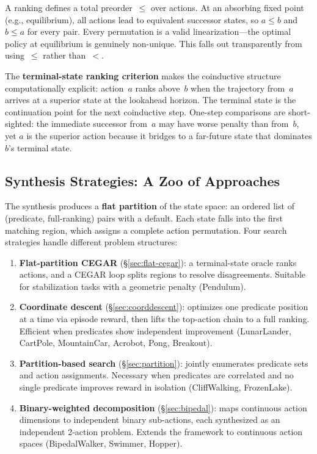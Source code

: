 \documentclass[9pt,a4paper]{article}
\theoremstyle{plain}
\theoremstyle{definition}
\theoremstyle{remark}
\begin{document}
A ranking defines a total preorder~$\le$ over actions.  At an
absorbing fixed point (e.g., equilibrium), all actions lead to
equivalent successor states, so $a \le b$ and $b \le a$ for every
pair.  Every permutation is a valid linearization---the optimal
policy at equilibrium is genuinely non-unique.  This falls out
transparently from using~$\le$ rather than~$<$.

The \textbf{terminal-state ranking criterion} makes the coinductive
structure computationally explicit: action~$a$ ranks above~$b$
when the trajectory from~$a$ arrives at a superior state at the
lookahead horizon.  The terminal state is the continuation point
for the next coinductive step.  One-step comparisons are
short-sighted: the immediate successor from~$a$ may have worse
penalty than from~$b$, yet $a$ is the superior action because it
bridges to a far-future state that dominates $b$'s terminal state.

\subsection{Synthesis Strategies: A Zoo of Approaches}

The synthesis produces a \textbf{flat partition} of the state space:
an ordered list of (predicate, full-ranking) pairs with a default.
Each state falls into the first matching region, which assigns a
complete action permutation.  Four search strategies handle
different problem structures:

\begin{enumerate}
\item \textbf{Flat-partition CEGAR} (\S\ref{sec:flat-cegar}):
      a terminal-state oracle ranks actions, and a CEGAR loop
      splits regions to resolve disagreements.  Suitable for
      stabilization tasks with a geometric penalty (Pendulum).

\item \textbf{Coordinate descent} (\S\ref{sec:coorddescent}):
      optimizes one predicate position at a time via episode
      reward, then lifts the top-action chain to a full ranking.
      Efficient when predicates show independent improvement
      (LunarLander, CartPole, MountainCar, Acrobot, Pong,
      Breakout).

\item \textbf{Partition-based search} (\S\ref{sec:partition}):
      jointly enumerates predicate sets and action assignments.
      Necessary when predicates are correlated and no single
      predicate improves reward in isolation
      (CliffWalking, FrozenLake).

\item \textbf{Binary-weighted decomposition} (\S\ref{sec:bipedal}):
      maps continuous action dimensions to independent binary
      sub-actions, each synthesized as an independent 2-action
      problem.  Extends the framework to continuous action
      spaces (BipedalWalker, Swimmer, Hopper).
\end{enumerate}
\end{document}
